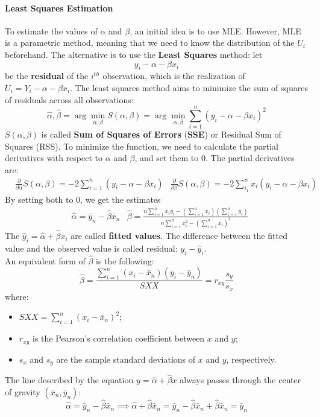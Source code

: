 \paragraph{Least Squares Estimation}
To estimate the values of $\alpha$ and $\beta$, an initial idea is to use MLE. However, MLE is a parametric method, meaning that we need to know the distribution of the $U_i$ beforehand. The alternative is to use the \textbf{Least Squares} method: let
\[
    y_i - \alpha - \beta x_i
\]
be the \textbf{residual} of the $i^{th}$ observation, which is the realization of $U_i = Y_i - \alpha - \beta x_i$. The least squares method aims to minimize the sum of squares of residuals across all observations:
\[
    \hat{\alpha}, \hat{\beta} = \arg \min_{\alpha, \beta} S(\alpha, \beta) = \arg \min_{\alpha, \beta} \sum_{i=1}^n (y_i - \alpha - \beta x_i)^2
\]
$S(\alpha, \beta)$ is called \textbf{Sum of Squares of Errors} (\textbf{SSE}) or Residual Sum of Squares (RSS). To minimize the function, we need to calculate the partial derivatives with respect to $\alpha$ and $\beta$, and set them to 0. The partial derivatives are:
\begin{align*}
    &\frac{\partial}{\partial \alpha} S(\alpha, \beta) = - 2 \sum_{i=1}^n (y_i - \alpha - \beta x_i) &\frac{\partial}{\partial \beta} S(\alpha, \beta) = - 2 \sum_{i_1}^n x_i (y_i - \alpha - \beta x_i)
\end{align*}
By setting both to 0, we get the estimates
\begin{align*}
    &\hat{\alpha} = \bar{y}_n - \hat{\beta} \bar{x}_n &\hat{\beta} = \frac{n \sum_{i=1}^n x_i y_i - (\sum_{i=1}^n x_i)(\sum_{i=1}^n y_i)}{n \sum_{i=1}^n x_i^2 - (\sum_{i=1}^n x_i)^2}
\end{align*}
The $\hat{y}_i = \hat{\alpha} + \hat{\beta} x_i$ are called \textbf{fitted values}. The difference between the fitted value and the observed value is called residual: $y_i - \hat{y}_i$. \\
An equivalent form of $\hat{\beta}$ is the following:
\[
    \hat{\beta} = \frac{\sum_{i=1}^n (x_i - \bar{x}_n)(y_i - \bar{y}_n)}{SXX} = r_{xy} \frac{s_y}{s_x}
\]
where:
\begin{itemize}[itemsep=0pt]
    \item $SXX = \sum_{i=1}^n (x_i - \bar{x}_n)^2$;
    \item $r_{xy}$ is the Pearson's correlation coefficient between $x$ and $y$;
    \item $s_x$ and $s_y$ are the sample standard deviations of $x$ and $y$, respectively.
\end{itemize}
The line described by the equation $y = \hat{\alpha} + \hat{\beta}x$ always passes through the center of gravity $(\bar{x}_n, \bar{y}_n)$:
\[
    \hat{\alpha} = \bar{y}_n - \hat{\beta} \bar{x}_n \implies \hat{\alpha} + \hat{\beta} \bar{x}_n = \bar{y}_n - \hat{\beta} \bar{x}_n + \hat{\beta} \bar{x}_n = \bar{y}_n
\]

